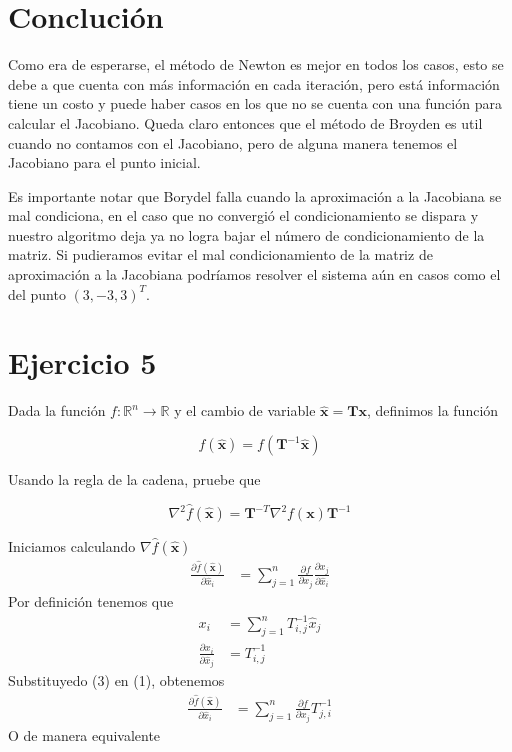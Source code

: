 \documentclass{article}
\begin{document}
\begin{multicols}{2}
\section{Conclución}

Como era de esperarse, el método de Newton es mejor en todos los casos, esto se debe a que cuenta con más información en cada iteración, pero está información tiene un costo y puede haber casos en los que no se cuenta con una función para calcular el Jacobiano. Queda claro entonces que el método de Broyden es util cuando no contamos con el Jacobiano, pero de alguna manera tenemos el Jacobiano para el punto inicial. 

Es importante notar que Borydel falla cuando la aproximación a la Jacobiana se mal condiciona, en el caso que no convergió el condicionamiento se dispara y nuestro algoritmo deja ya no logra bajar el número de condicionamiento de la matriz. Si pudieramos evitar el mal condicionamiento de la matriz de aproximación a la Jacobiana podríamos resolver el sistema aún en casos como el del punto $(3, -3 , 3)^T$.

\section{Ejercicio 5}

Dada la función $f : \mathbb{R}^n \rightarrow \mathbb{R}$ y el cambio de variable $\hat{\boldsymbol{x}} = \boldsymbol{T} \boldsymbol{x}$, definimos la función

$$\hat{f}(\hat{\boldsymbol{x}}) = f(\boldsymbol{T}^{-1} \hat{\boldsymbol{x}})$$

Usando la regla de la cadena, pruebe que

$$ \nabla^2 \hat{f}(\hat{\boldsymbol{x}}) = \boldsymbol{T}^{-T} \nabla^2f(\boldsymbol{x}) \boldsymbol{T}^{-1} $$

Iniciamos calculando $\nabla \hat{f}(\hat{\boldsymbol{x}})$
\begin{align}
  \frac{\partial \hat{f}(\hat{\boldsymbol{x}})}{\partial \hat{x}_i} & = \sum_{j=1}^{n}\frac{\partial f}{\partial x_j}\frac{\partial x_j}{\partial \hat{x}_i}
\end{align}
Por definición tenemos que
\begin{align}
  x_i &= \sum_{j=1}^{n}T^{-1}_{i,j}\hat{x}_j\\
  \frac{\partial x_i}{\partial \hat{x}_j} &= T^{-1}_{i,j}
\end{align}
Substituyedo (3) en (1), obtenemos
\begin{align}
  \frac{\partial \hat{f}(\hat{\boldsymbol{x}})}{\partial \hat{x}_i} & = \sum_{j=1}^{n}\frac{\partial f}{\partial x_j} T^{-1}_{j,i}
\end{align}
O de manera equivalente 


\end{multicols}
\end{document}
